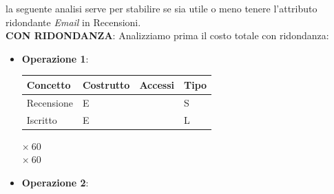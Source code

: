 \documentclass[10pt,twoside]{article}
\begin{document}
{{        la seguente analisi serve per stabilire se sia utile o meno tenere l’attributo ridondante
        \textit{Email} in Recensioni. \\

        \textbf{CON RIDONDANZA}: Analizziamo prima il costo totale con ridondanza:
        \begin{itemize}
            \item \textbf{Operazione 1}:
        
            \noindent
            \begin{minipage}[t]{0.7\textwidth}
                \vspace{0pt}
                \begin{tabular}{|>{\centering\arraybackslash}p{2.6cm}|
                                >{\centering\arraybackslash}p{2cm}|
                                >{\centering\arraybackslash}p{3cm}|
                                >{\centering\arraybackslash}p{2cm}|}
                    \hline
                    \rowcolor{lightgray!40}
                    \textbf{Concetto} & \textbf{Costrutto} & \textbf{Accessi} & \textbf{Tipo} \\
                    \hline
                    \rowcolor{white!40}
                    Recensione & E & 1 & S \\
                    \hline
                    \rowcolor{white!40}
                    Iscritto & E & 1 & L \\
                    \hline
                \end{tabular}
            \end{minipage}%
            \begin{minipage}[t]{0.4\textwidth}
                \vspace{3.5ex} %
                \begin{flushleft}
                    $\times\ 60$ \\
                    $\times\ 60$ \\
                \end{flushleft}
            \end{minipage}
        
            \vspace{1em}
        
            \item \textbf{Operazione 2}:
        

\end{itemize}}}
\end{document}

